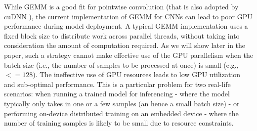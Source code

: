 While GEMM is a good fit for pointwise convolution (that is also adopted by cuDNN \cite{ChetlurWVCTCS14}), the current implementation of
GEMM for CNNs can lead to poor GPU performance during model deployment. A typical GEMM implementation uses a fixed block size to distribute
work across parallel threads, without taking into consideration the amount of computation required. As we will show later in the paper,
such a strategy cannot make effective use of the GPU parallelism when the batch size (i.e., the number of samples to be processed at once)
is small (e.g., $<= 128$). The ineffective use of GPU resources leads to low GPU utilization and sub-optimal performance. This is a
particular problem for two real-life scenarios: when running a trained model for inferencing - where the model typically only takes in one
or a few samples (an hence a small batch size) - or performing on-device distributed training on an embedded device - where the number of
training samples is likely to be small due to resource constraints.



